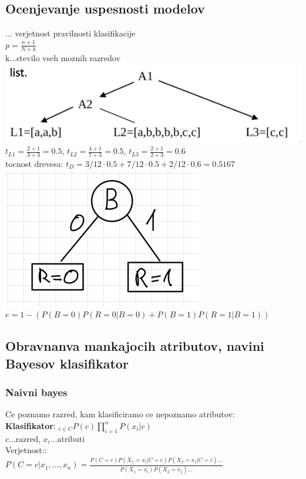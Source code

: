 \subsection{Ocenjevanje uspesnosti modelov}
 $\dots$ verjetnost pravilnosti klasifikacije\\
 $p=\frac{n+1}{N+k}$\\
k...stevilo vseh moznih razredov\\
\includegraphics[width=\columnwidth]{./images/drevo-laplace.png}\\
$t_{L1}=\frac{2+1}{3+3}=0.5$,
$t_{L2}=\frac{4+1}{7+3}=0.5$,
$t_{L3}=\frac{2+1}{2+3}=0.6$\\
tocnost drevesa: $t_D=3/12\cdot 0.5 + 7/12\cdot 0.5 + 2/12\cdot 0.6=0.5167$\\
\includegraphics[width=\columnwidth]{./images/klasifikacijska-napaka.png}\\
$e=1-(P(B=0)P(R=0|B=0)+P(B=1)P(R=1|B=1))$

\subsection{Obravnanva mankajocih atributov, navini Bayesov klasifikator}
\subsubsection{Naivni bayes}
Ce poznamo razred, kam klasificiramo ce nepoznamo atributov:\\
\textbf{Klasifikator}: $_{c\in C} P(c)\prod\limits_{i=1}^n P(x_i|c)$\\
$c\dots \text{razred}$, $x_i\dots \text{atributi}$\\
Verjetnost::\\
$P(C=c|x_1,\dots,x_n)=\frac{P(C=c)P(X_1=x_i|C=c)P(X_2=x_j|C=c)\dots}{P(X_1=x_i)P(X_2=x_j)\dots}$\\


